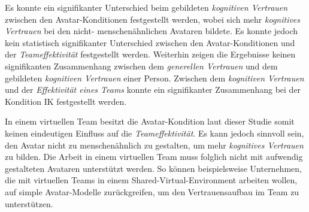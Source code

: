\documentclass[sigchi]{acmart}
\begin{document}
Es konnte ein signifikanter Unterschied beim gebildeten \textit{kognitiven Vertrauen} zwischen den Avatar-Konditionen festgestellt werden, wobei sich mehr \textit{kognitives Vertrauen} bei den nicht- menschenähnlichen Avataren bildete. Es konnte jedoch kein statistisch signifikanter Unterschied zwischen den Avatar-Konditionen und der \textit{Teameffektivität} festgestellt werden. Weiterhin zeigen die Ergebnisse keinen signifikanten Zusammenhang zwischen dem \textit{generellen Vertrauen} und dem gebildeten \textit{kognitiven Vertrauen} einer Person. Zwischen dem \textit{kognitiven Vertrauen} und der \textit{Effektivität eines Teams} konnte ein signifikanter Zusammenhang bei der Kondition IK festgestellt werden.

In einem virtuellen Team besitzt die Avatar-Kondition laut dieser Studie somit keinen eindeutigen Einfluss auf die \textit{Teameffektivität}. Es kann jedoch sinnvoll sein, den Avatar nicht zu menschenähnlich zu gestalten, um mehr \textit{kognitives Vertrauen} zu bilden.
Die Arbeit in einem virtuellen Team muss folglich nicht mit aufwendig gestalteten Avataren unterstützt werden. So können beispielsweise Unternehmen, die mit virtuellen Teams in einem Shared-Virtual-Environment arbeiten wollen, auf simple Avatar-Modelle zurückgreifen, um den Vertrauensaufbau im Team zu unterstützen.





\appendix
\end{document}
